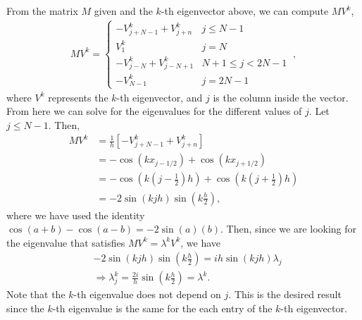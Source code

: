 \begin{enumerate}
From the matrix $M$ given and the $k$-th eigenvector above, we can compute $MV^k$,
\begin{align*}
MV^k = \begin{cases} 
-V_{j+N-1}^k + V_{j+n}^k & j \leq N-1 \\
V_1^k & j=N \\
-V_{j-N}^k + V_{j-N+1}^k & N+1 \leq j < 2N-1 \\
-V_{N-1}^k & j = 2N-1
\end{cases}~,
\end{align*}
where $V^k$ represents the $k$-th eigenvector, and $j$ is the column inside the vector. From here we can solve for the eigenvalues for the different values of $j$. Let $j \leq N-1$. Then,
\begin{align*}
MV^k &= \frac{1}{h}\left[-V_{j+N-1}^k + V_{j+n}^k\right] \\ 
&= -\cos(kx_{j-1/2}) + \cos(kx_{j+1/2}) \\
& = -\cos\left(k\left(j-\frac{1}{2}\right)h\right)+\cos\left(k\left(j+\frac{1}{2}\right)h\right) \\
& = -2\sin(kjh)\sin\left(k\frac{h}{2}\right),
\end{align*}
where we have used the identity $\cos(a+b) - \cos(a - b) = -2\sin(a)(b)$. Then, since we are looking for the eigenvalue that satisfies $MV^k=\lambda^kV^k$, we have
\begin{align*}
&-2\sin(kjh)\sin\left(k\frac{h}{2}\right) = ih\sin(kjh)\lambda_j \\ &\Rightarrow \lambda_j^k = \frac{2i}{h}\sin\left(k\frac{h}{2}\right)=\lambda^k.
\end{align*}
Note that the $k$-th eigenvalue does not depend on $j$. This is the desired result since the $k$-th eigenvalue is the same for the each entry of the $k$-th eigenvector. 


\end{enumerate}
